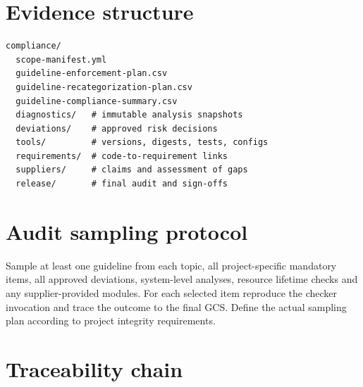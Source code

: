 \documentclass[10pt,letterpaper]{article}
\begin{document}
\section{Evidence structure}
\begin{lstlisting}[style=plaincode]
compliance/
  scope-manifest.yml
  guideline-enforcement-plan.csv
  guideline-recategorization-plan.csv
  guideline-compliance-summary.csv
  diagnostics/   # immutable analysis snapshots
  deviations/    # approved risk decisions
  tools/         # versions, digests, tests, configs
  requirements/  # code-to-requirement links
  suppliers/     # claims and assessment of gaps
  release/       # final audit and sign-offs
\end{lstlisting}
\section{Audit sampling protocol}
Sample at least one guideline from each topic, all project-specific mandatory items, all approved deviations, system-level analyses, resource lifetime checks and any supplier-provided modules. For each selected item reproduce the checker invocation and trace the outcome to the final GCS. Define the actual sampling plan according to project integrity requirements.
\section{Traceability chain}
\begin{center}\end{center}
\end{document}
